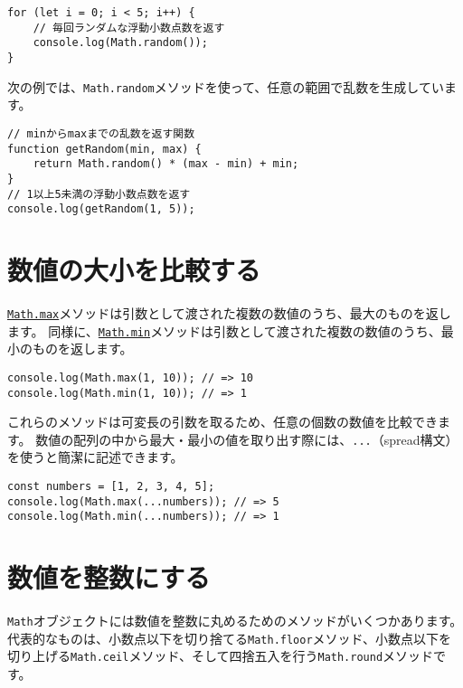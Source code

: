 \begin{lstlisting}
for (let i = 0; i < 5; i++) {
    // 毎回ランダムな浮動小数点数を返す
    console.log(Math.random());
}
\end{lstlisting}

次の例では、\texttt{Math.random}メソッドを使って、任意の範囲で乱数を生成しています。

\begin{lstlisting}
// minからmaxまでの乱数を返す関数
function getRandom(min, max) {
    return Math.random() * (max - min) + min;
}
// 1以上5未満の浮動小数点数を返す
console.log(getRandom(1, 5));
\end{lstlisting}

\hypertarget{compare-number}{%
\section{数値の大小を比較する}\label{compare-number}}

\href{https://developer.mozilla.org/ja/docs/Web/JavaScript/Reference/Global_Objects/Math/max}{\texttt{Math.max}}メソッドは引数として渡された複数の数値のうち、最大のものを返します。
同様に、\href{https://developer.mozilla.org/ja/docs/Web/JavaScript/Reference/Global_Objects/Math/min}{\texttt{Math.min}}メソッドは引数として渡された複数の数値のうち、最小のものを返します。

\begin{lstlisting}
console.log(Math.max(1, 10)); // => 10
console.log(Math.min(1, 10)); // => 1
\end{lstlisting}

これらのメソッドは可変長の引数を取るため、任意の個数の数値を比較できます。
数値の配列の中から最大・最小の値を取り出す際には、\texttt{...}（spread構文）を使うと簡潔に記述できます。

\begin{lstlisting}
const numbers = [1, 2, 3, 4, 5];
console.log(Math.max(...numbers)); // => 5
console.log(Math.min(...numbers)); // => 1
\end{lstlisting}

\hypertarget{convert-to-integer}{%
\section{数値を整数にする}\label{convert-to-integer}}

\texttt{Math}オブジェクトには数値を整数に丸めるためのメソッドがいくつかあります。
代表的なものは、小数点以下を切り捨てる\texttt{Math.floor}メソッド、小数点以下を切り上げる\texttt{Math.ceil}メソッド、そして四捨五入を行う\texttt{Math.round}メソッドです。

